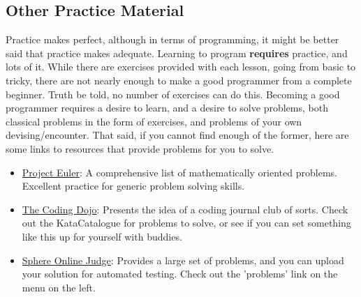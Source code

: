 \documentclass[a4paper,11pt]{article}
\begin{document}
{\begin{enumerate}
\section{Other Practice Material}

Practice makes perfect, although in terms of programming, it might be   better said that practice makes adequate. Learning to program   \textbf{requires} practice, and lots of it. While there are   exercises provided with each lesson, going from basic to tricky, there   are not nearly enough to make a good programmer from a complete   beginner. Truth be told, no number of exercises can do this. Becoming a   good programmer requires a desire to learn, and a desire to solve   problems, both classical problems in the form of exercises, and   problems of your own devising/encounter. That said, if you cannot find   enough of the former, here are some links to resources that provide   problems for you to solve.
\begin{itemize}
	\item \href{http://projecteuler.net/}{Project Euler}: A    comprehensive list of mathematically oriented problems. Excellent    practice for generic problem solving skills.
	\item \href{http://www.codingdojo.org}{The Coding Dojo}:    Presents the idea of a coding journal club of sorts. Check out the    KataCatalogue for problems to solve, or see if you can set something    like this up for yourself with buddies.
	\item \href{http://www.spoj.pl}{Sphere Online Judge}: Provides    a large set of problems, and you can upload your solution for    automated testing. Check out the 'problems' link on the menu on the    left.
\end{itemize}
% 
% 
% 



\end{enumerate}}
\end{document}
